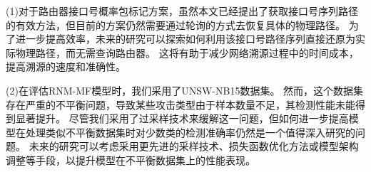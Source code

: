 (1)对于路由器接口号概率包标记方案，虽然本文已经提出了获取接口号序列路径的有效方法，但目前的方案仍然需要通过轮询的方式去恢复具体的物理路径。
为了进一步提高效率，未来的研究可以探索如何利用该接口号路径序列直接还原为实际物理路径，而无需查询路由器。
这将有助于减少网络溯源过程中的时间成本，提高溯源的速度和准确性。\par

(2)在评估RNM-MF模型时，我们采用了UNSW-NB15数据集。
然而，这个数据集存在严重的不平衡问题，导致某些攻击类型由于样本数量不足，其检测性能未能得到显著提升。
尽管我们采用了过采样技术来缓解这一问题，但如何进一步提高模型在处理类似不平衡数据集时对少数类的检测准确率仍然是一个值得深入研究的问题。
未来的研究可以考虑采用更先进的采样技术、损失函数优化方法或模型架构调整等手段，以提升模型在不平衡数据集上的性能表现。\par